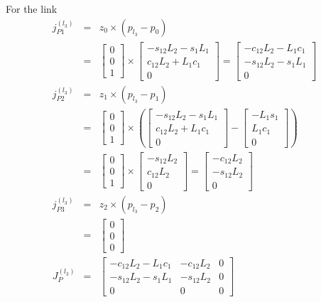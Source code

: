 \documentclass{article}
\begin{document}
For the link
\begin{eqnarray*}
	j_{P1}^{(l_3)} &=& z_{0} \times \left( p_{l_3} - p_0 \right) \\
		       &=& \begin{bmatrix} 0 \\ 0 \\ 1 \end{bmatrix} \times \begin{bmatrix} -s_{12}L_2 - s_1L_1 \\ c_{12}L_2 + L_1 c_1 \\ 0 \end{bmatrix} = \begin{bmatrix} -c_{12}L_2 - L_1c_1 \\ -s_{12}L_2 - s_1L_1 \\ 0 \end{bmatrix}\\
	j_{P2}^{(l_3)} &=& z_{1} \times \left( p_{l_3} - p_1 \right) \\
		       &=& \begin{bmatrix} 0 \\ 0 \\ 1 \end{bmatrix} \times \left(\begin{bmatrix} -s_{12}L_2 - s_1L_1 \\ c_{12}L_2 + L_1 c_1 \\ 0 \end{bmatrix} - \begin{bmatrix} -L_1s_1 \\ L_1c_1 \\ 0 \end{bmatrix} \right) \\
		       &=& \begin{bmatrix} 0 \\ 0 \\ 1 \end{bmatrix} \times \begin{bmatrix} -s_{12}L_2 \\ c_{12}L_2 \\ 0 \end{bmatrix} = \begin{bmatrix} -c_{12}L_2 \\ -s_{12}L_2 \\ 0 \end{bmatrix} \\
	j_{P3}^{(l_3)} &=& z_{2} \times \left( p_{l_3} - p_2 \right) \\
		       &=& \begin{bmatrix} 0 \\ 0 \\ 0 \end{bmatrix} \\
	J_P^{(l_3)} &=& \begin{bmatrix}-c_{12}L_2 - L_1c_1 & -c_{12}L_2 & 0 \\ -s_{12}L_2 - s_1L_1 & -s_{12}L_2 & 0 \\ 0 & 0 & 0 \end{bmatrix}
\end{eqnarray*}
\end{document}
